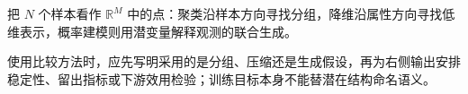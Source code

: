 \documentclass[UTF8,a4paper,11pt,openany]{ctexbook}
\begin{document}
\setcounter{page}{542}
\setcounter{chapter}{24}
\setcounter{figure}{0}
\pagestyle{headings}
\begin{geometrybox}
把 $N$ 个样本看作 $\mathbb{R}^{M}$ 中的点：聚类沿样本方向寻找分组，降维沿属性方向寻找低维表示，概率建模则用潜变量解释观测的联合生成。
\end{geometrybox}

使用比较方法时，应先写明采用的是分组、压缩还是生成假设，再为右侧输出安排稳定性、留出指标或下游效用检验；训练目标本身不能替潜在结构命名语义。
\end{document}
